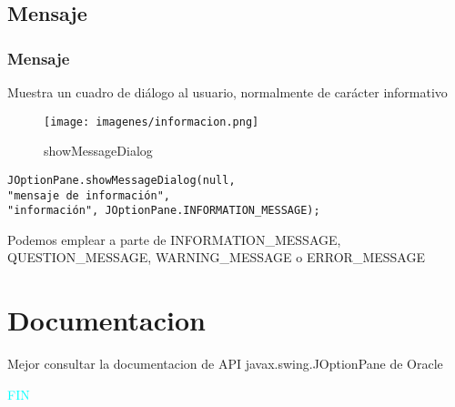 \documentclass{beamer}
\begin{document}
\subsection{Mensaje}
\begin{frame}[fragile]
    \frametitle{Mensaje}
Muestra un cuadro de diálogo al usuario, normalmente de carácter informativo
\begin{figure}
\texttt{[image: imagenes/informacion.png]}
\caption{showMessageDialog}
\end{figure}
\pause
 \begin{verbatim}
JOptionPane.showMessageDialog(null,
"mensaje de información",
"información", JOptionPane.INFORMATION_MESSAGE);
\end{verbatim}
\pause
Podemos emplear a parte de INFORMATION\_MESSAGE, QUESTION\_MESSAGE, WARNING\_MESSAGE o ERROR\_MESSAGE
\end{frame}


\section{Documentacion}
\begin{frame}[fragile]
Mejor consultar la documentacion de API javax.swing.JOptionPane de Oracle \vspace{1cm}
\pause
\begin{center}

\begin{Huge}
\textcolor{cyan}{FIN}
\end{Huge}
\end{center}
\end{frame}
\end{document}
